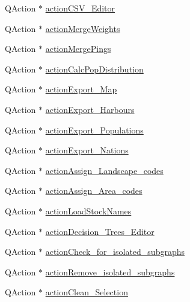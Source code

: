 \begin{DoxyCompactItemize}
\item 
Q\+Action $\ast$ \mbox{\hyperlink{class_ui___main_window_a0a368d5470f4607ea9981deff82b3dc4}{action\+C\+S\+V\+\_\+\+Editor}}
\item 
Q\+Action $\ast$ \mbox{\hyperlink{class_ui___main_window_a1f858caac63ccf7ce8e4b8d21718cc6c}{action\+Merge\+Weights}}
\item 
Q\+Action $\ast$ \mbox{\hyperlink{class_ui___main_window_aedcc04b1603314bc0d349734e7c014c2}{action\+Merge\+Pings}}
\item 
Q\+Action $\ast$ \mbox{\hyperlink{class_ui___main_window_a6ba246c78c31ec61b1a5b4291040d005}{action\+Calc\+Pop\+Distribution}}
\item 
Q\+Action $\ast$ \mbox{\hyperlink{class_ui___main_window_ab6a78a15d25d3e68b61e7dc177281c12}{action\+Export\+\_\+\+Map}}
\item 
Q\+Action $\ast$ \mbox{\hyperlink{class_ui___main_window_a4f38e1b578a512f128bb9817f045e50f}{action\+Export\+\_\+\+Harbours}}
\item 
Q\+Action $\ast$ \mbox{\hyperlink{class_ui___main_window_a54fc6fe89fbe6fc4c7218a1c127f6cf7}{action\+Export\+\_\+\+Populations}}
\item 
Q\+Action $\ast$ \mbox{\hyperlink{class_ui___main_window_a37df5b1a713d7de8c31a2f416836d74d}{action\+Export\+\_\+\+Nations}}
\item 
Q\+Action $\ast$ \mbox{\hyperlink{class_ui___main_window_a86ba37505ff44f7f581d8496068bf7e6}{action\+Assign\+\_\+\+Landscape\+\_\+codes}}
\item 
Q\+Action $\ast$ \mbox{\hyperlink{class_ui___main_window_a660bea03a8230081323f457d8b2737f7}{action\+Assign\+\_\+\+Area\+\_\+codes}}
\item 
Q\+Action $\ast$ \mbox{\hyperlink{class_ui___main_window_ab5701e8efa2a7c334eb74fc5dbe2465a}{action\+Load\+Stock\+Names}}
\item 
Q\+Action $\ast$ \mbox{\hyperlink{class_ui___main_window_a26f3aad377e285721fd3a62559919c95}{action\+Decision\+\_\+\+Trees\+\_\+\+Editor}}
\item 
Q\+Action $\ast$ \mbox{\hyperlink{class_ui___main_window_a80005c70601b5f36504c06508723b285}{action\+Check\+\_\+for\+\_\+isolated\+\_\+subgraphs}}
\item 
Q\+Action $\ast$ \mbox{\hyperlink{class_ui___main_window_a9d52179cafa002b749634574ee3a9e19}{action\+Remove\+\_\+isolated\+\_\+subgraphs}}
\item 
Q\+Action $\ast$ \mbox{\hyperlink{class_ui___main_window_ac7a0970f25a3090efaba292fcef6e1ae}{action\+Clean\+\_\+\+Selection}}

\end{DoxyCompactItemize}
